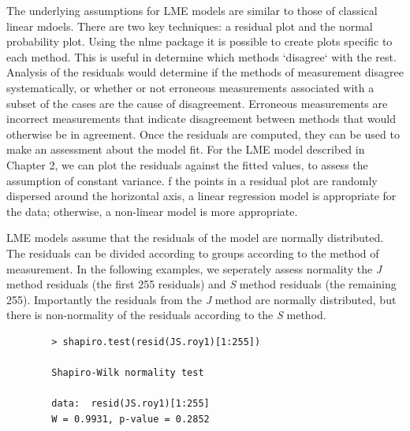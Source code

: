 \documentclass[12pt, a4paper]{report}
\theoremstyle{plain}
\theoremstyle{definition}
\theoremstyle{remark}
\begin{document}
	The underlying assumptions for LME models are similar to those of classical linear mdoels. There are two key techniques: a residual plot and the normal probability plot. Using the nlme package it is possible to create plots specific to each method. This is useful in determine which methods `disagree` with the rest.
	Analysis of the residuals would determine if the methods of measurement disagree systematically, or whether or not erroneous measurements associated with a subset of the cases are the cause of disagreement.
	Erroneous measurements are incorrect measurements that indicate disagreement between methods that would otherwise be in agreement.
	Once the residuals are computed, they can be used to make an assessment about the model fit. For the LME model described in Chapter 2, we can plot the residuals against the fitted values, to assess the assumption of constant variance. f the points in a residual plot are randomly dispersed around the horizontal axis, a linear regression model is appropriate for the data; otherwise, a non-linear model is more appropriate.
	
	
	LME models assume that the residuals of the model are normally distributed.  The residuals can be divided according to groups according to the method of measurement. In the following examples, we seperately assess normality the \textit{J} method residuals (the first 255 residuals) and \textit{S} method residuals (the remaining 255). Importantly the residuals from the \textit{J} method are normally distributed, but there is non-normality of the residuals according to the \textit{S} method.
	\begin{framed}
		\begin{verbatim}
		> shapiro.test(resid(JS.roy1)[1:255])
		
		Shapiro-Wilk normality test
		
		data:  resid(JS.roy1)[1:255]
		W = 0.9931, p-value = 0.2852
		\end{verbatim}
	\end{framed}
	
\end{document}
